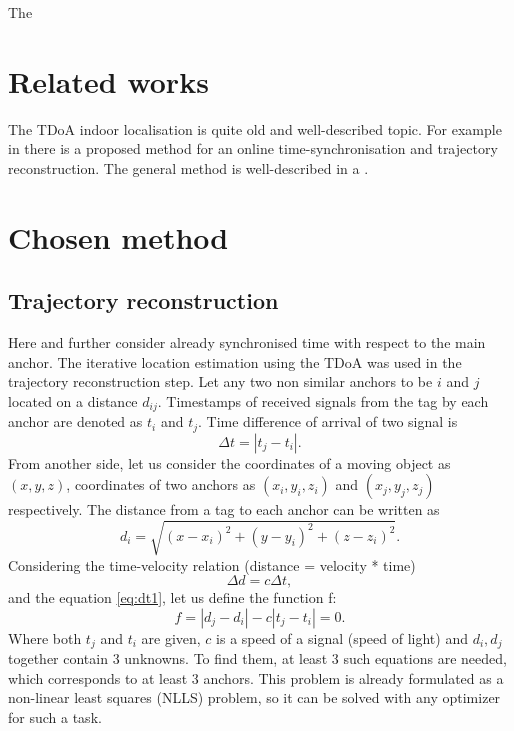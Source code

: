 \documentclass[10pt,journal,compsoc]{IEEEtran}
\begin{document}
The 

\section{Related works}
\label{sec:ps}
The TDoA indoor localisation is quite old and well-described topic. For example in \cite{Yuzan2019} there is a proposed method for an online time-synchronisation and trajectory reconstruction. The general method is well-described in a \cite{Keefe2017}.

\section{Chosen method}
\label{sec:method}

\subsection{Trajectory reconstruction}
\label{sec:traj_recon}
Here and further consider already synchronised time with respect to the main anchor.
The iterative location estimation using the TDoA was used in the trajectory reconstruction step.
Let any two non similar anchors to be $i$ and $j$ located on a distance $d_{ij}$.
Timestamps of received signals from the tag by each anchor are denoted as $t_i$ and $t_j$.
Time difference of arrival of two signal is
\begin{equation}
    \Delta{t} = |t_j - t_i|.
    \label{eq:dt1}
\end{equation}
From another side, let us consider the coordinates of a moving object as $(x, y, z)$, coordinates of two anchors as $(x_i, y_i, z_i)$ and $(x_j, y_j, z_j)$ respectively.
The distance from a tag to each anchor can be written as
\begin{equation}
    d_i = \sqrt{(x-x_i)^2 + (y-y_i)^2 + (z - z_i)^2}.
    \label{eq:dist}
\end{equation}
Considering the time-velocity relation (distance = velocity * time) 
\begin{equation}
    \Delta{d} = c\Delta{t},
\end{equation}
and the equation \eqref{eq:dt1}, let us define the function f:
\begin{equation}
    \label{eq:f}
    f = |d_j - d_i| - c |t_j - t_i| = 0.
\end{equation}
Where both $t_j$ and $t_i$ are given, $c$ is a speed of a signal (speed of light) and $d_i, d_j$ together contain 3 unknowns. 
To find them, at least 3 such equations are needed, which corresponds to at least 3 anchors.
This problem is already formulated as a non-linear least squares (NLLS) problem, so it can be solved with any optimizer for such a task.
\end{document}
